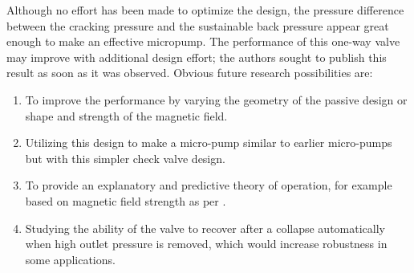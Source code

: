 \documentclass[]{asme2ej}
\begin{document}
Although no effort has been made to optimize the design, the pressure
difference between the cracking pressure and the sustainable back
pressure appear great enough to make an effective micropump. The
performance of this one-way valve may improve with additional design
effort; the authors sought to publish this result as soon as it was
observed.  Obvious future research possibilities are:
\begin{enumerate}
\item  To improve the
performance by varying the geometry of the passive design or shape and
strength of the magnetic field.
\item Utilizing this design to make a micro-pump
similar to earlier micro-pumps but with this simpler check valve
design.
\item To provide an explanatory and predictive theory of operation,
for example based on magnetic field strength as per \cite{ando2009ferrofluidic}.
\item Studying the ability of the valve to recover after
  a collapse automatically when high outlet pressure is removed,
  which would increase robustness in some applications.
\end{enumerate}

%




\end{document}
